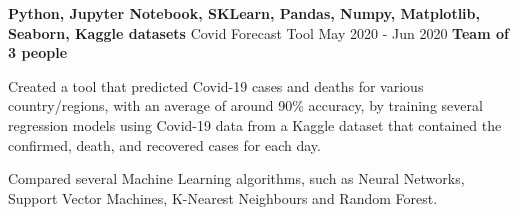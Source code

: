   \cventry
    {\textbf{Python, Jupyter Notebook, SKLearn, Pandas, Numpy, Matplotlib, Seaborn, Kaggle datasets}} %
    {Covid Forecast Tool \href{https://github.com/EduRibeiro00/CovidForecast-feup-iart}{\faExternalLink}} %
    {May 2020 - Jun 2020} %
    {\textbf{Team of 3 people}} %
    {
      \begin{cvitems} %
        \item {Created a tool that predicted Covid-19 cases and deaths for various country/regions, with an average of around 90\% accuracy, by training several regression models using Covid-19 data from a Kaggle dataset that contained the confirmed, death, and recovered cases for each day.}
        \item {Compared several Machine Learning algorithms, such as Neural Networks, Support Vector Machines, K-Nearest Neighbours and Random Forest.}
      \end{cvitems}
    }